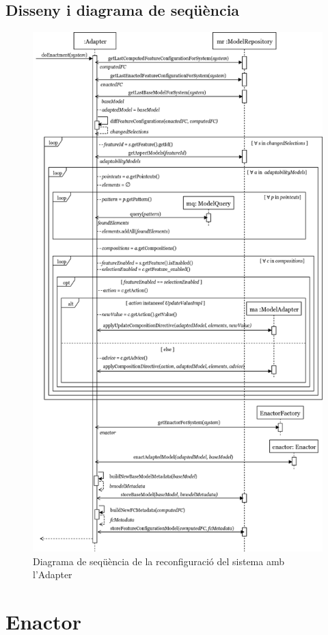 \subsection{Disseny i diagrama de seqüència}

\begin{figure}[!h]
\centering
\includegraphics[width=13cm]{Figures/Figure22}
\decoRule
\caption{Diagrama de seqüència de la reconfiguració del sistema amb l'Adapter}
\label{fig:Figura22}
\end{figure}

\section{Enactor}
